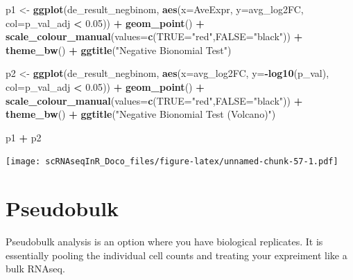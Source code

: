 \documentclass[
]{book}
\newenvironment{Shaded}{\begin{snugshade}}{\end{snugshade}}
\newcommand{\AttributeTok}[1]{\textcolor[rgb]{0.13,0.29,0.53}{#1}}
\newcommand{\FloatTok}[1]{\textcolor[rgb]{0.00,0.00,0.81}{#1}}
\newcommand{\FunctionTok}[1]{\textcolor[rgb]{0.13,0.29,0.53}{\textbf{#1}}}
\newcommand{\NormalTok}[1]{#1}
\newcommand{\OtherTok}[1]{\textcolor[rgb]{0.56,0.35,0.01}{#1}}
\newcommand{\SpecialCharTok}[1]{\textcolor[rgb]{0.81,0.36,0.00}{\textbf{#1}}}
\newcommand{\StringTok}[1]{\textcolor[rgb]{0.31,0.60,0.02}{#1}}
\begin{document}
\begin{Shaded}
\begin{Highlighting}[]
\NormalTok{p1 }\OtherTok{\textless{}{-}} \FunctionTok{ggplot}\NormalTok{(de\_result\_negbinom, }\FunctionTok{aes}\NormalTok{(}\AttributeTok{x=}\NormalTok{AveExpr, }\AttributeTok{y=}\NormalTok{avg\_log2FC, }\AttributeTok{col=}\NormalTok{p\_val\_adj }\SpecialCharTok{\textless{}} \FloatTok{0.05}\NormalTok{)) }\SpecialCharTok{+}
  \FunctionTok{geom\_point}\NormalTok{() }\SpecialCharTok{+}
  \FunctionTok{scale\_colour\_manual}\NormalTok{(}\AttributeTok{values=}\FunctionTok{c}\NormalTok{(}\StringTok{\textquotesingle{}TRUE\textquotesingle{}}\OtherTok{=}\StringTok{"red"}\NormalTok{,}\StringTok{\textquotesingle{}FALSE\textquotesingle{}}\OtherTok{=}\StringTok{"black"}\NormalTok{)) }\SpecialCharTok{+} 
  \FunctionTok{theme\_bw}\NormalTok{() }\SpecialCharTok{+}
  \FunctionTok{ggtitle}\NormalTok{(}\StringTok{"Negative Bionomial Test"}\NormalTok{)}


\NormalTok{p2 }\OtherTok{\textless{}{-}} \FunctionTok{ggplot}\NormalTok{(de\_result\_negbinom, }\FunctionTok{aes}\NormalTok{(}\AttributeTok{x=}\NormalTok{avg\_log2FC, }\AttributeTok{y=}\SpecialCharTok{{-}}\FunctionTok{log10}\NormalTok{(p\_val), }\AttributeTok{col=}\NormalTok{p\_val\_adj }\SpecialCharTok{\textless{}} \FloatTok{0.05}\NormalTok{)) }\SpecialCharTok{+}
  \FunctionTok{geom\_point}\NormalTok{() }\SpecialCharTok{+}
  \FunctionTok{scale\_colour\_manual}\NormalTok{(}\AttributeTok{values=}\FunctionTok{c}\NormalTok{(}\StringTok{\textquotesingle{}TRUE\textquotesingle{}}\OtherTok{=}\StringTok{"red"}\NormalTok{,}\StringTok{\textquotesingle{}FALSE\textquotesingle{}}\OtherTok{=}\StringTok{"black"}\NormalTok{)) }\SpecialCharTok{+} 
  \FunctionTok{theme\_bw}\NormalTok{() }\SpecialCharTok{+}
  \FunctionTok{ggtitle}\NormalTok{(}\StringTok{"Negative Bionomial Test (Volcano)"}\NormalTok{)}

\NormalTok{p1 }\SpecialCharTok{+}\NormalTok{ p2}
\end{Highlighting}
\end{Shaded}

\texttt{[image: scRNAseqInR\_Doco\_files/figure-latex/unnamed-chunk-57-1.pdf]}

\hypertarget{pseudobulk}{%
\section{Pseudobulk}\label{pseudobulk}}

Pseudobulk analysis is an option where you have biological replicates. It is essentially pooling the individual cell counts and treating your expreiment like a bulk RNAseq.
\end{document}
